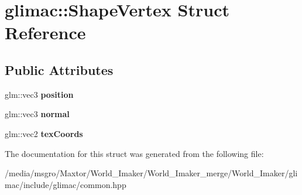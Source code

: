 \hypertarget{structglimac_1_1ShapeVertex}{}\section{glimac\+:\+:Shape\+Vertex Struct Reference}
\label{structglimac_1_1ShapeVertex}
\subsection*{Public Attributes}
\begin{DoxyCompactItemize}
\item 
\mbox{\label{structglimac_1_1ShapeVertex_a727bc4adace4f00e47069ce7373e3b97}} 
glm\+::vec3 {\bfseries position}
\item 
\mbox{\label{structglimac_1_1ShapeVertex_af8ef5c93da6bc86b5dcfa3d8e2a8fc21}} 
glm\+::vec3 {\bfseries normal}
\item 
\mbox{\label{structglimac_1_1ShapeVertex_ab694e76716c4cdc5e8636325b5fbeee2}} 
glm\+::vec2 {\bfseries tex\+Coords}
\end{DoxyCompactItemize}


The documentation for this struct was generated from the following file\+:\begin{DoxyCompactItemize}
\item 
/media/msgro/\+Maxtor/\+World\+\_\+\+Imaker/\+World\+\_\+\+Imaker\+\_\+merge/\+World\+\_\+\+Imaker/glimac/include/glimac/common.\+hpp\end{DoxyCompactItemize}
